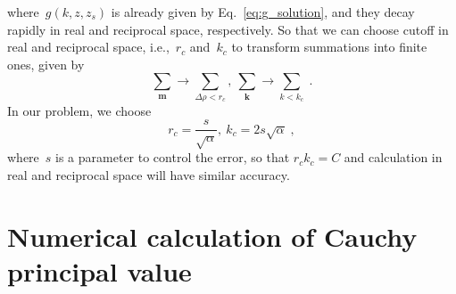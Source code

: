 \documentclass[aps,prl,reprint,showpacs,floatfix,superscriptaddress, onecolumn]{revtex4-2}
\newcommand{\V}[1]{\boldsymbol{#1}} %
\begin{document}
where~$g(k, z, z_s)$ is already given by Eq.~\eqref{eq:g_solution}, and they decay rapidly in real and reciprocal space, respectively.
So that we can choose cutoff in real and reciprocal space, i.e.,~$r_c$ and~$k_c$ to transform summations into finite ones, given by
\begin{equation}
    \sum_{\V m} \to \sum_{\Delta \rho < r_c},~\sum_{\V{k}} \to \sum_{k < k_c}\;.
\end{equation}
In our problem, we choose 
\begin{equation}
    r_c = \frac{s}{\sqrt{\alpha}},~k_c = 2 s \sqrt{\alpha}\;,
\end{equation}
where~$s$ is a parameter to control the error, so that $r_c k_c = C$ and calculation in real and reciprocal space will have similar accuracy.

\section{Numerical calculation of Cauchy principal value}
\end{document}
